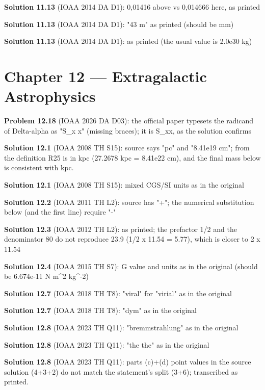 \noindent\textbf{Solution 11.13} (IOAA 2014 DA D1): 0,01416 above vs 0,014666 here, as printed
\smallskip

\noindent\textbf{Solution 11.13} (IOAA 2014 DA D1): "43 m" as printed (should be mm)
\smallskip

\noindent\textbf{Solution 11.13} (IOAA 2014 DA D1): as printed (the usual value is 2.0e30 kg)
\smallskip

\section*{Chapter 12 --- Extragalactic Astrophysics}

\noindent\textbf{Problem 12.18} (IOAA 2026 DA D03): the official paper typesets the radicand of Delta-alpha as "S\_x x" (missing braces); it is S\_xx, as the solution confirms
\smallskip

\noindent\textbf{Solution 12.1} (IOAA 2008 TH S15): source says "pc" and "8.41e19 cm"; from the definition R25 is in kpc (27.2678 kpc = 8.41e22 cm), and the final mass below is consistent with kpc.
\smallskip

\noindent\textbf{Solution 12.1} (IOAA 2008 TH S15): mixed CGS/SI units as in the original
\smallskip

\noindent\textbf{Solution 12.2} (IOAA 2011 TH L2): source has "+"; the numerical substitution below (and the first line) require "-"
\smallskip

\noindent\textbf{Solution 12.3} (IOAA 2012 TH L2): as printed; the prefactor 1/2 and the denominator 80 do not reproduce 23.9 (1/2 x 11.54 = 5.77), which is closer to 2 x 11.54
\smallskip

\noindent\textbf{Solution 12.4} (IOAA 2015 TH S7): G value and units as in the original (should be 6.674e-11 N m\^{}2 kg\^{}-2)
\smallskip

\noindent\textbf{Solution 12.7} (IOAA 2018 TH T8): "viral" for "virial" as in the original
\smallskip

\noindent\textbf{Solution 12.7} (IOAA 2018 TH T8): "dym" as in the original
\smallskip

\noindent\textbf{Solution 12.8} (IOAA 2023 TH Q11): "bremmstrahlung" as in the original
\smallskip

\noindent\textbf{Solution 12.8} (IOAA 2023 TH Q11): "the the" as in the original
\smallskip

\noindent\textbf{Solution 12.8} (IOAA 2023 TH Q11): parts (c)+(d) point values in the source solution (4+3+2) do not match the statement's split (3+6); transcribed as printed.
\smallskip

